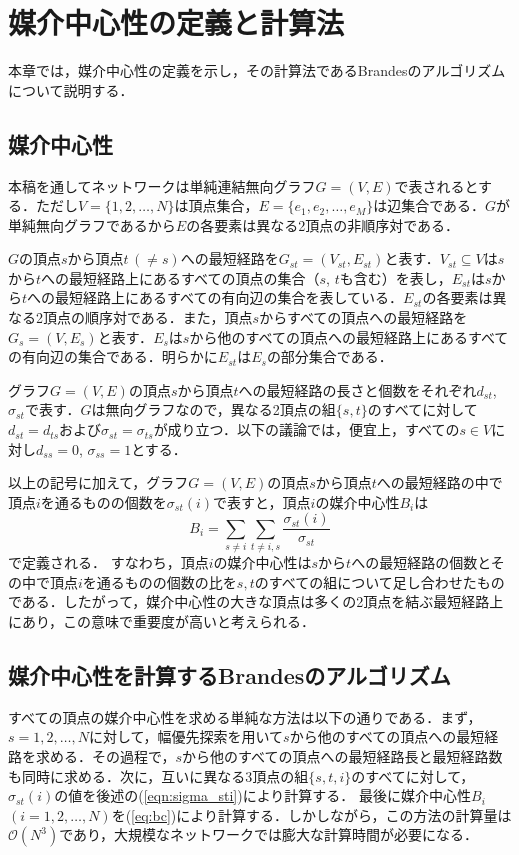 \chapter{媒介中心性の定義と計算法}
\label{chap:definition-of-betweenness-centrality}
本章では，媒介中心性の定義を示し，その計算法であるBrandesのアルゴリズムについて説明する．

\section{媒介中心性}
本稿を通してネットワークは単純連結無向グラフ$G=(V,E)$で表されるとする．ただし$V=\{1,2,\ldots,N\}$は頂点集合，$E=\{e_1,e_2,\ldots,\allowbreak e_M\}$は辺集合である．$G$が単純無向グラフであるから$E$の各要素は異なる2頂点の非順序対である．

$G$の頂点$s$から頂点$t\,(\neq s)$への最短経路を$G_{st}=(V_{st},E_{st})$と表す．$V_{st} \subseteq V$は$s$から$t$への最短経路上にあるすべての頂点の集合（$s$, $t$も含む）を表し，$E_{st}$は$s$から$t$への最短経路上にあるすべての有向辺の集合を表している．$E_{st}$の各要素は異なる2頂点の順序対である．また，頂点$s$からすべての頂点への最短経路を$G_{s}=(V,E_s)$と表す．$E_s$は$s$から他のすべての頂点への最短経路上にあるすべての有向辺の集合である．明らかに$E_{st}$は$E_s$の部分集合である．

グラフ$G=(V,E)$の頂点$s$から頂点$t$への最短経路の長さと個数をそれぞれ$d_{st}$, $\sigma_{st}$で表す．$G$は無向グラフなので，異なる2頂点の組$\{s,t\}$のすべてに対して$d_{st}=d_{ts}$および$\sigma_{st}=\sigma_{ts}$が成り立つ．以下の議論では，便宜上，すべての$s \in V$に対し$d_{ss}=0$, $\sigma_{ss}=1$とする．

以上の記号に加えて，グラフ$G=(V,E)$の頂点$s$から頂点$t$への最短経路の中で頂点$i$を通るものの個数を$\sigma_{st}(i)$で表すと，頂点$i$の媒介中心性$B_i$は
\begin{equation}
B_i=\sum_{s\neq i}\sum_{t\neq {i,s}}\frac{\sigma_{st}(i)}{\sigma_{st}}
\label{eq:bc}
\end{equation}
で定義される\cite{Freeman1977}．
すなわち，頂点$i$の媒介中心性は$s$から$t$への最短経路の個数とその中で頂点$i$を通るものの個数の比を$s,t$のすべての組について足し合わせたものである．したがって，媒介中心性の大きな頂点は多くの2頂点を結ぶ最短経路上にあり，この意味で重要度が高いと考えられる．

\section{媒介中心性を計算するBrandesのアルゴリズム}
すべての頂点の媒介中心性を求める単純な方法は以下の通りである．まず，$s=1,2,\ldots,N$に対して，幅優先探索を用いて$s$から他のすべての頂点への最短経路を求める．その過程で，$s$から他のすべての頂点への最短経路長と最短経路数も同時に求める．次に，互いに異なる3頂点の組$\{s,t,i\}$のすべてに対して，$\sigma_{st}(i)$の値を後述の(\ref{eqn:sigma_sti})により計算する．
最後に媒介中心性$B_i$ $(i=1,2,\ldots,N)$を(\ref{eq:bc})により計算する．しかしながら，この方法の計算量は$\mathcal{O}(N^3)$であり，大規模なネットワークでは膨大な計算時間が必要になる．

